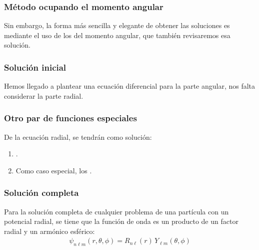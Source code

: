 \documentclass[12pt]{beamer}
\begin{document}
\begin{frame}
\frametitle{Método ocupando el momento angular}
Sin embargo, \pause la forma más sencilla y elegante de obtener las soluciones es mediante el uso de los \emph{} del momento angular, que también revisaremos esa solución.
\end{frame}
\begin{frame}
\frametitle{Solución inicial}
Hemos llegado a plantear una ecuación diferencial para la parte angular, \pause nos falta considerar la parte radial.
\end{frame}
\begin{frame}
\frametitle{Otro par de funciones especiales}
De  la ecuación radial, se tendrán como solución:
\begin{enumerate}[<+->]
\item \textbf{}.
\item Como caso especial, los \textbf{}.
\end{enumerate}
\end{frame}
\begin{frame}
\frametitle{Solución completa}
Para la solución completa de cualquier problema de una partícula con un potencial radial, se tiene que la función de onda es un producto de un factor radial y un armónico esférico:
\pause
\begin{align*}
\psi_{n \ell m} (r, \theta, \phi) = R_{n \ell} (r) \, Y_{\ell m} (\theta, \phi)
\end{align*}
\end{frame}
\end{document}
